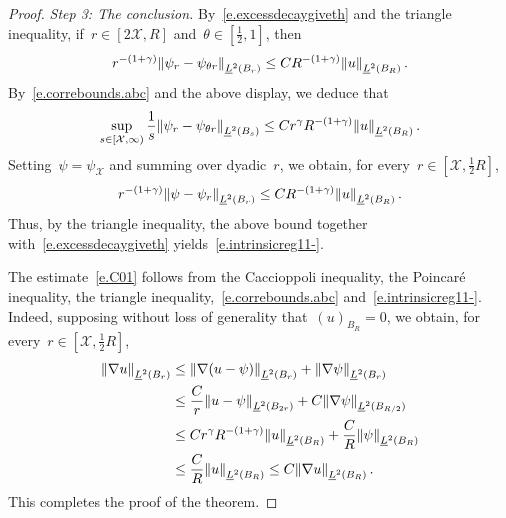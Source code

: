 \documentclass[11pt,twoside]{article} %
\numberwithin{equation}{section}
\theoremstyle{definition}
\let\originalleft\left
\let\originalright\right
\renewcommand{\left}{\mathopen{}\mathclose\bgroup\originalleft}
\renewcommand{\right}{\aftergroup\egroup\originalright}
\newcommand{\X}{\mathcal{X}}
\begin{document}
\begin{proof}
\smallskip

\emph{Step 3: The conclusion.}
By~\eqref{e.excessdecaygiveth} and the triangle inequality, if~$r\in [2\X, R]$ and~$\theta \in [\frac12, 1]$, then 
\begin{equation}
\label{e.catchme}
r^{-(1+\gamma)} \left\| \psi_{r} - \psi_{\theta r} \right\|_{\underline{L}^2(B_{r})}
\leq 
C R^{-(1+\gamma)} \left\| u \right\|_{\underline{L}^2(B_{R})}
\,.
\end{equation}
By~\eqref{e.correbounds.abc} and the above display, we deduce that 
\begin{align*}  
\sup_{s \in [\X , \infty)} \frac1s \left\| \psi_{r} - \psi_{\theta r} \right\|_{\underline{L}^2(B_{s})}
\leq 
C r^\gamma R^{-(1+\gamma)} \left\| u \right\|_{\underline{L}^2(B_{R})}
\,.
\end{align*}
Setting~$\psi = \psi_\X$ and summing over dyadic~$r$, we obtain, for every~$r\in[\X,\frac12R]$,  
\begin{equation*}
r^{-(1+\gamma)} \left\| \psi  - \psi_{r} \right\|_{\underline{L}^2(B_{r})}
\leq 
C R^{-(1+\gamma)} \left\| u \right\|_{\underline{L}^2(B_{R})}
\,.
\end{equation*}
Thus, by the triangle inequality, the above bound together with~\eqref{e.excessdecaygiveth} yields~\eqref{e.intrinsicreg11-}.

\smallskip

The estimate~\eqref{e.C01} follows from the Caccioppoli inequality, the Poincar\'e inequality, the triangle inequality,~\eqref{e.correbounds.abc} and~\eqref{e.intrinsicreg11-}. Indeed, supposing without loss of generality that~$(u)_{B_R} = 0$, we obtain, for every~$r\in[\X,\frac12R]$, 
\begin{align*}
\left\| \nabla u \right\|_{\underline{L}^2(B_r)} 
&
\leq 
\left\| \nabla (u-\psi) \right\|_{\underline{L}^2(B_r)}  + \left\| \nabla \psi \right\|_{\underline{L}^2(B_r)} 
\\ & 
\leq 
\frac{C}{r} 
\left\| u-\psi  \right\|_{\underline{L}^2(B_{2r})}  
+ 
C \left\| \nabla \psi \right\|_{\underline{L}^2(B_{R/2})} 
\\ & 
\leq 
Cr^\gamma R^{-(1+\gamma)} 
\left\| u \right\|_{\underline{L}^2(B_R)} 
+
\frac{C}{R} \left\| \psi \right\|_{\underline{L}^2(B_R)} 
\\ & 
\leq
\frac{C}{R} \left\| u \right\|_{\underline{L}^2(B_R)} 
\leq 
C \left\| \nabla u \right\|_{\underline{L}^2(B_R)} \,.
\end{align*}
This completes the proof of the theorem. 
\end{proof}
\end{document}
